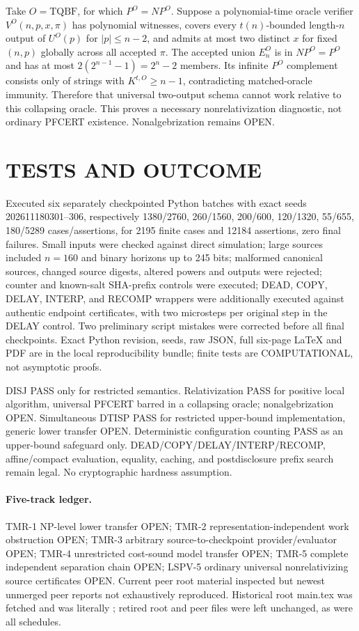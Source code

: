 \documentclass[11pt]{article}
\begin{document}
Take $O=\mathrm{TQBF}$, for which $P^O=NP^O$. Suppose a polynomial-time oracle verifier $V^O(n,p,x,\pi)$ has polynomial witnesses, covers every $t(n)$-bounded length-$n$ output of $U^O(p)$ for $|p|\le n-2$, and admits at most two distinct $x$ for fixed $(n,p)$ globally across all accepted $\pi$. The accepted union $E_n^O$ is in $NP^O=P^O$ and has at most $2(2^{n-1}-1)=2^n-2$ members. Its infinite $P^O$ complement consists only of strings with $K^{t,O}\ge n-1$, contradicting matched-oracle immunity. Therefore that universal two-output schema cannot work relative to this collapsing oracle. This proves a necessary nonrelativization diagnostic, not ordinary PFCERT existence. Nonalgebrization remains OPEN.

\section{TESTS AND OUTCOME}
Executed six separately checkpointed Python batches with exact seeds 202611180301--306, respectively 1380/2760, 260/1560, 200/600, 120/1320, 55/655, 180/5289 cases/assertions, for 2195 finite cases and 12184 assertions, zero final failures. Small inputs were checked against direct simulation; large sources included $n=160$ and binary horizons up to 245 bits; malformed canonical sources, changed source digests, altered powers and outputs were rejected; counter and known-salt SHA-prefix controls were executed; DEAD, COPY, DELAY, INTERP, and RECOMP wrappers were additionally executed against authentic endpoint certificates, with two microsteps per original step in the DELAY control. Two preliminary script mistakes were corrected before all final checkpoints. Exact Python revision, seeds, raw JSON, full six-page LaTeX and PDF are in the local reproducibility bundle; finite tests are COMPUTATIONAL, not asymptotic proofs.

DISJ PASS only for restricted semantics. Relativization PASS for positive local algorithm, universal PFCERT barred in a collapsing oracle; nonalgebrization OPEN. Simultaneous DTISP PASS for restricted upper-bound implementation, generic lower transfer OPEN. Deterministic configuration counting PASS as an upper-bound safeguard only. DEAD/COPY/DELAY/INTERP/RECOMP, affine/compact evaluation, equality, caching, and postdisclosure prefix search remain legal. No cryptographic hardness assumption.

\paragraph{Five-track ledger.} TMR-1 NP-level lower transfer OPEN; TMR-2 representation-independent work obstruction OPEN; TMR-3 arbitrary source-to-checkpoint provider/evaluator OPEN; TMR-4 unrestricted cost-sound model transfer OPEN; TMR-5 complete independent separation chain OPEN; LSPV-5 ordinary universal nonrelativizing source certificates OPEN. Current peer root material inspected but newest unmerged peer reports not exhaustively reproduced. Historical root main.tex was fetched and was literally ; retired root and peer files were left unchanged, as were all schedules.
\end{document}
